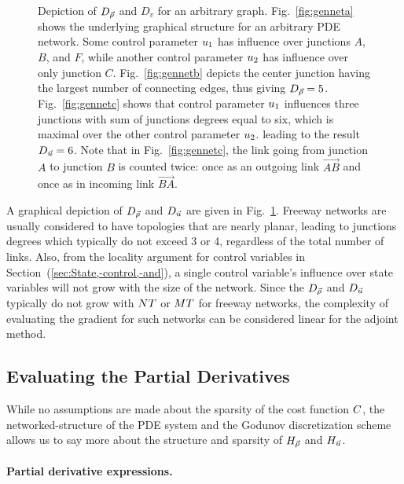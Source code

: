 \begin{figure}
\begin{centering}
{		}
		\par\end{centering}
				
		\caption{Depiction of $D_{\vec{\rho}}$ and $D_{v}$ for an arbitrary graph. Fig.~\ref{fig:genneta}
			shows the underlying graphical structure for an arbitrary PDE network.
			Some control parameter $u_{1}$ has influence over junctions
			$A$, $B$, and $F$, while another control parameter $u_{2}$
			has influence over only junction $C$. Fig.~\ref{fig:gennetb}
			depicts the center junction having the largest number of connecting
			edges, thus giving $D_{\vec{\rho}}=5$. Fig.~\ref{fig:gennetc} shows
			that control parameter $u_{1}$ influences three junctions with
			sum of junctions degrees equal to six, which is maximal over the other
			control parameter $u_{2}$. leading to the result $D_{\vec{u}}=6$.
			Note that in Fig.~\ref{fig:gennetc}, the link going from junction
			$A$ to junction $B$ is counted twice: once as an outgoing link $\vec{AB}$
			and once as in incoming link $\vec{BA}$.\label{fig:Depicting--and}}
		\end{figure}

A graphical depiction of $D_{\vec{\rho}}$ and $D_{\vec{u}}$ are given
in Fig.~\ref{fig:Depicting--and}. Freeway networks are usually considered to have topologies that are
		nearly planar, leading to junctions degrees which typically do not
		exceed 3 or 4, regardless of the total number of links. Also, from
		the locality argument for control variables in Section~(\ref{sec:State,-control,-and}),
		a single control variable's influence over state variables will not
		grow with the size of the network. Since the $D_{\vec{\rho}}$ and
		$D_{\vec{u}}$ typically do not grow with $NT$ or
		$MT$ for freeway networks, the complexity of evaluating
		the gradient for such networks can be considered linear for the adjoint
		method.
				
				
		\subsection{Evaluating the Partial Derivatives\label{sub:Evaluating--and}}
				
		While no assumptions are made about the sparsity of the cost function
		$C$, the networked-structure of the PDE system and the Godunov
		discretization scheme allows us to say more about the structure and
		sparsity of $H_{\vec{\rho}}$ and $H_{\vec{u}}$.
				
				
		\paragraph{Partial derivative expressions.}
				
